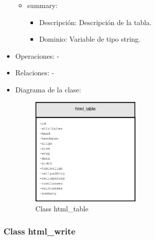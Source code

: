 \begin{itemize}
\begin{itemize}
			\item summary:
				\begin{itemize}
					\item Descripción: Descripción de la tabla.
					\item Dominio: Variable de tipo string.
				\end{itemize}
		\end{itemize}
	\item Operaciones: -
	\item Relaciones: -
	\item Diagrama de la clase:
		\begin{figure}[h]
			\centering
			\includegraphics[width=0.5\textwidth]{./img/html_table.eps}
			\caption{Class html\_table}
		\end{figure}
\end{itemize}

\subsubsection{Class html\_write}

